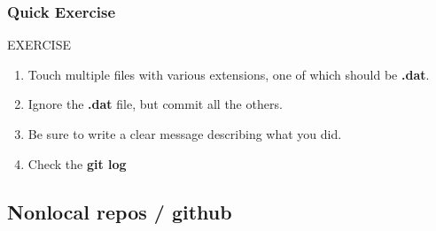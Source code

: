 \documentclass{beamer}
\begin{document}
\begin{frame}[fragile]
\frametitle{Quick Exercise}
    \begin{block}{EXERCISE}
        \begin{enumerate}
        \item Touch multiple files with various extensions, one of which should be \textbf{.dat}.
        \item Ignore the \textbf{.dat} file, but commit all the others.
        \item Be sure to write a clear message describing what you did.
        \item Check the \textbf{git log}
        \end{enumerate}
    \end{block}

\end{frame}

\subsection{Nonlocal repos / github}
\end{document}
